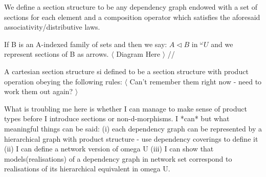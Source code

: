 \documentclass[10pt,a4paper]{scrartcl}
\begin{document}
We define a section structure to be any dependency graph endowed with a set of sections for each element and a composition operator which satisfies the aforesaid associativity/distributive laws.

If B is an A-indexed family of sets and then we say: $A \triangleleft B$ in $^\omega U$ and we represent sections of B as arrows.
$\langle$ Diagram Here $\rangle$
//

\noindent A cartesian section structure si defined to be a section structure with product operation obeying the following rules:
$\langle$ Can't remember them right now - need to work them out again? $\rangle$

\noindent What is troubling me here is whether I can manage to make sense of product types before I introduce sections or non-d-morphisms. I *can* but what meaningful things can be said: (i) each dependency graph can be represented by a hierarchical graph with product structure - use dependency coverings to define it (ii) I can define a network version of 
omega U (iii) I can show that models(realisations) of a dependency graph in network set correspond to realisations of its hierarchical equivalent in omega U.
  
  

\end{document}
